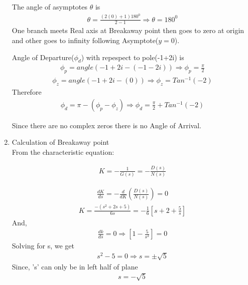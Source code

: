 \begin{enumerate}[label=\thesection.\arabic*.,ref=\thesection.\theenumi]
The angle of asymptotes $\theta$ is
\begin{align}
\theta=\frac{(2(0)+1) 180^{0}}{2-1} \Rightarrow \theta = 180^{0}
\end{align}
One branch meets Real axis at Breakaway point then goes to zero at origin and other goes to infinity following Asymptote($y=0$).

Angle of Departure($\phi_{d}$) with repespect to pole(-1+2i) is
\begin{align}
\phi_{p} = angle(-1+2i-(-1-2i))\Rightarrow \phi_{p}= \frac{\pi}{2}
\end{align}
\begin{align}
\phi_{z} = angle(-1+2i-(0))\Rightarrow \phi_{z}= Tan^{-1}(-2) 
\end{align}
Therefore
\begin{align}
\phi_{d} = \pi - (\phi_{p} - \phi_{z}) \Rightarrow \phi_{d} = \frac{\pi}{2} + Tan^{-1}(-2)
\end{align}

Since there are no complex zeros there is no Angle of Arrival.




\item Calculation of Breakaway point \\

From the characteristic equation:
    
    \begin{align}
        K=-\frac{1}{G(s)}=-\frac{D(s)}{N(s)}    
    \end{align}

    \begin{align}
        \frac{d K}{d s}=-\frac{d}{d K}\left(\frac{D(s)}{N(s)}\right)=0    
    \end{align}
    \begin{align}
        K=\frac{-\left(s^{2}+2 s+5\right)}{6 s}=-\frac{1}{6}\left[s+2+\frac{5}{s}\right]    
    \end{align}
    And,
    \begin{align}
        \frac{d k}{d s}=0 \Rightarrow\left[1-\frac{5}{s^{2}}\right]=0 
    \end{align}
    Solving for s, we get
    \begin{align}
        s^{2}-5=0 \Rightarrow s=\pm \sqrt{5}    
    \end{align}
    Since, 's' can only be in left half of plane
    \begin{align}
        \boxed{s=-\sqrt{5}}    
    \end{align}
    

\end{enumerate}
